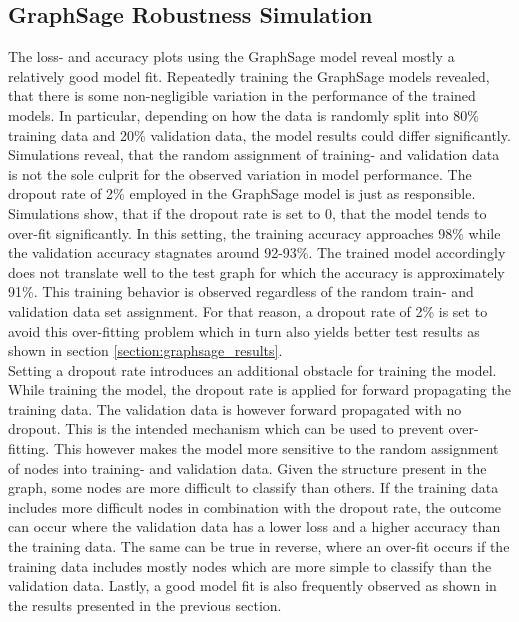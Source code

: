   \subsection{GraphSage Robustness Simulation}
  \label{section:graphsage_simulation}
  
  The loss- and accuracy plots using the GraphSage model reveal mostly a 
  relatively good model fit. Repeatedly training the GraphSage models revealed, 
  that there is some non-negligible variation in the performance of the trained 
  models. In particular, depending on how the data is randomly split into 80\% training
  data and 20\% validation data, the model results could differ significantly.
  Simulations reveal, that the random assignment of training- and validation
  data is not the sole culprit for the observed variation in model performance. 
  The dropout rate of 2\% employed in the GraphSage model is just as responsible. 
  Simulations show, that if the dropout rate is set to 0, that the model tends
  to over-fit significantly. In this setting, the training accuracy approaches
  98\% while the validation accuracy stagnates around 92-93\%. The trained model 
  accordingly does not translate well to the test graph for which the accuracy
  is approximately 91\%. This training behavior is observed regardless of the
  random train- and validation data set assignment. For that reason, a dropout 
  rate of 2\% is set to avoid this over-fitting problem which in turn also 
  yields better test results as shown in section \ref{section:graphsage_results}. \\

  \noindent Setting a dropout rate introduces an additional obstacle
  for training the model. While training the model, the dropout rate is
  applied for forward propagating the training data. The validation data is 
  however forward propagated with no dropout. This is the intended mechanism
  which can be used to prevent over-fitting. This however makes the model more
  sensitive to the random assignment of nodes into training- and validation
  data. Given the structure present in the graph, some nodes are more difficult
  to classify than others. If the training data includes more difficult nodes
  in combination with the dropout rate, the outcome can occur where the
  validation data has a lower loss and a higher accuracy than the training
  data. The same can be true in reverse, where an over-fit occurs if the
  training data includes mostly nodes which are more simple to classify than
  the validation data. Lastly, a good model fit is also frequently observed as
  shown in the results presented in the previous section. \\

